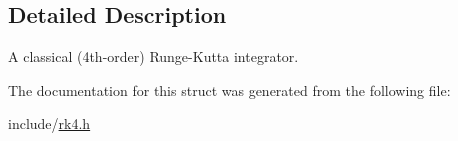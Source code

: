 \subsection{Detailed Description}
A classical (4th-\/order) Runge-\/\-Kutta integrator. 

The documentation for this struct was generated from the following file\-:\begin{DoxyCompactItemize}
\item 
include/\hyperlink{rk4_8h}{rk4.\-h}\end{DoxyCompactItemize}
